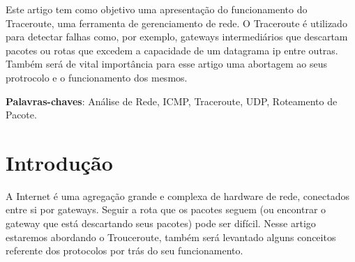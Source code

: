 \documentclass[
	article,			%
	11pt,				%
	oneside,			%
	a4paper,			%
	english,			%
	brazil,				%
	sumario=tradicional
	]{abntex2}
\begin{document}
\frenchspacing 


%
%
\maketitle

\begin{resumoumacoluna}
 Este artigo tem como objetivo uma apresentação do funcionamento do Traceroute, uma ferramenta de gerenciamento de rede. O Traceroute é utilizado para detectar falhas como, por exemplo, gateways intermediários que descartam pacotes ou rotas que excedem a capacidade de um datagrama ip entre outras. Também será de vital importância para esse artigo uma abortagem ao seus protrocolo e o funcionamento dos mesmos.
 
 \vspace{\onelineskip}
 
 \noindent
 \textbf{Palavras-chaves}: Análise de Rede, ICMP, Traceroute, UDP, Roteamento de Pacote.
\end{resumoumacoluna}


\textual

\section*{Introdução}
A Internet é uma agregação grande e complexa de hardware de rede, conectados entre si por gateways. Seguir a rota que os pacotes seguem (ou encontrar o gateway que está descartando seus pacotes) pode ser difícil. 
Nesse artigo estaremos abordando o Trouceroute, também será levantado alguns conceitos referente dos protocolos por trás do seu funcionamento.
\end{document}
